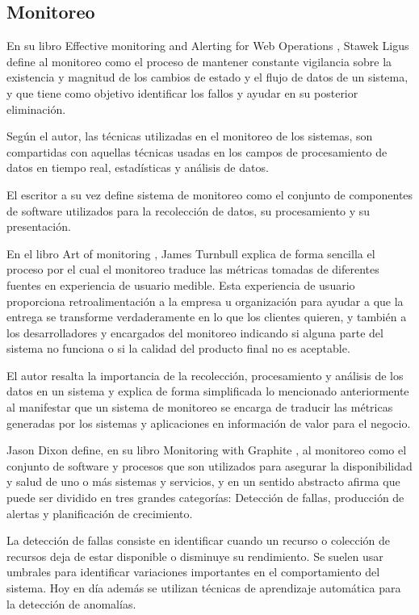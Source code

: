 \subsection{Monitoreo}
\label{monitoreo}
En su libro Effective monitoring and Alerting for Web Operations \cite[p.~2]{monitoreo:efective_monitoring_and_alerting}, Stawek Ligus define al monitoreo como el proceso de mantener constante vigilancia sobre la existencia y magnitud de los cambios de estado y el flujo de datos de un sistema, y que tiene como objetivo identificar los fallos y ayudar en su posterior eliminación.

Según el autor, las técnicas utilizadas en el monitoreo de los sistemas, son compartidas con aquellas técnicas usadas en los campos de procesamiento de datos en tiempo real, estadísticas y análisis de datos.

El escritor a su vez define sistema de monitoreo como el conjunto de componentes de software utilizados para la recolección de datos, su procesamiento y su presentación.

En el libro Art of monitoring \cite[p.~8]{monitoreo:art_of_monitoring}, James Turnbull explica de forma sencilla el proceso por el cual el monitoreo traduce las métricas tomadas de diferentes fuentes en experiencia de usuario medible. Esta experiencia de usuario proporciona retroalimentación a la empresa u organización para ayudar a que la entrega se transforme verdaderamente en lo que los clientes quieren, y también a los desarrolladores y encargados del monitoreo indicando si alguna parte del sistema no funciona o si la calidad del producto final no es aceptable.

El autor resalta la importancia de la recolección, procesamiento y análisis de los datos en un sistema y explica de forma simplificada lo mencionado anteriormente al manifestar que un sistema de monitoreo se encarga de traducir las métricas generadas por los sistemas y aplicaciones en información de valor para el negocio.

Jason Dixon define, en su libro Monitoring with Graphite \cite[p.~15]{monitoreo:monitoring_with_grapfite}, al monitoreo como el conjunto de software y procesos que son utilizados para asegurar la disponibilidad y salud de uno o más sistemas y servicios, y en un sentido abstracto afirma que puede ser dividido en tres grandes categorías: Detección de fallas, producción de alertas y planificación de crecimiento.

La detección de fallas consiste en identificar cuando un recurso o colección de recursos deja de estar disponible o disminuye su rendimiento. Se suelen usar umbrales para identificar variaciones importantes en el comportamiento del sistema. Hoy en día además se utilizan técnicas de aprendizaje automática para la detección de anomalías.

